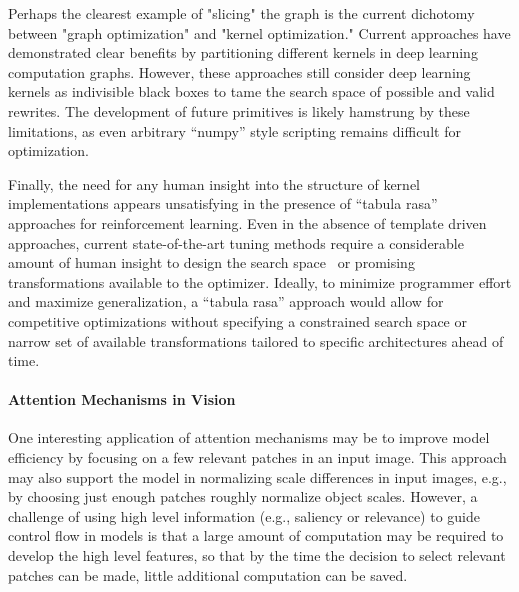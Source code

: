 Perhaps the clearest example of "slicing" the graph is the current dichotomy between "graph optimization" and "kernel optimization."
Current approaches have demonstrated clear benefits by partitioning different kernels in deep learning computation graphs.
However, these approaches still consider deep learning kernels as indivisible black boxes to tame the search space of possible and valid rewrites.
The development of future primitives is likely hamstrung by these limitations, as even arbitrary ``numpy'' style scripting remains difficult for optimization.

Finally, the need for any human insight into the structure of kernel implementations appears unsatisfying in the presence of ``tabula rasa''~\cite{silver2017mastering} approaches for reinforcement learning.
Even in the absence of template driven approaches, current state-of-the-art tuning methods require a considerable amount of human insight to design the search space~\cite{zheng2020ansor} or promising transformations available to the optimizer.
Ideally, to minimize programmer effort and maximize generalization, a ``tabula rasa'' approach would allow for competitive optimizations without specifying a constrained search space or narrow set of available transformations tailored to specific architectures ahead of time.

\paragraph{Attention Mechanisms in Vision}
One interesting application of attention mechanisms may be to improve model efficiency by focusing on a few relevant patches in an input image.
This approach may also support the model in normalizing scale differences in input images, e.g., by choosing just enough patches roughly normalize object scales.
However, a challenge of using high level information (e.g., saliency or relevance) to guide control flow in models is that a large amount of computation may be required to develop the high level features, so that by the time the decision to select relevant patches can be made, little additional computation can be saved.
